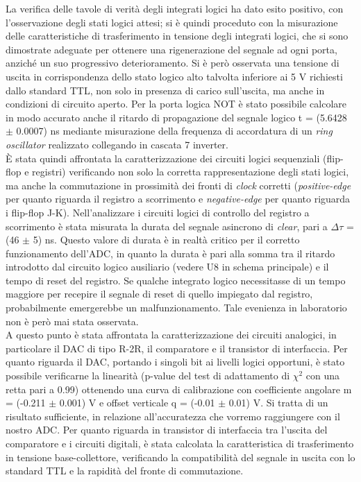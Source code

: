 \documentclass[journal]{IEEEtran}
\begin{document}
La verifica delle tavole di verità degli integrati logici ha dato esito positivo, con l'osservazione degli stati logici attesi; si è quindi proceduto con la misurazione delle caratteristiche di trasferimento in tensione degli integrati logici, che si sono dimostrate adeguate per ottenere una rigenerazione del segnale ad ogni porta, anziché un suo progressivo deterioramento. Si è però osservata una tensione di uscita in corrispondenza dello stato logico alto talvolta inferiore ai 5 V richiesti dallo standard TTL, non solo in presenza di carico sull'uscita, ma anche in condizioni di circuito aperto. Per la porta logica NOT è stato possibile calcolare in modo accurato anche il ritardo di propagazione del segnale logico t = (5.6428 $\pm$ 0.0007) ns mediante misurazione della frequenza di accordatura di un \textit{ring oscillator} realizzato collegando in cascata 7 inverter.
\\

È stata quindi affrontata la caratterizzazione dei circuiti logici sequenziali (flip-flop e registri) verificando non solo la corretta rappresentazione degli stati logici, ma anche la commutazione in prossimità dei fronti di \textit{clock} corretti (\textit{positive-edge} per quanto riguarda il registro a scorrimento e \textit{negative-edge} per quanto riguarda i flip-flop J-K). Nell'analizzare i circuiti logici di controllo del registro a scorrimento è stata misurata la durata del segnale asincrono di \textit{clear}, pari a $\Delta\tau$ = (46 $\pm$ 5) ns. Questo valore di durata è in realtà critico per il corretto funzionamento dell'ADC, in quanto la durata è pari alla somma tra il ritardo introdotto dal circuito logico ausiliario (vedere U8 in schema principale) e il tempo di reset del registro. Se qualche integrato logico necessitasse di un tempo maggiore per recepire il segnale di reset di quello impiegato dal registro, probabilmente emergerebbe un malfunzionamento. Tale evenienza in laboratorio non è però mai stata osservata.
\\

A questo punto è stata affrontata la caratterizzazione dei circuiti analogici, in particolare il DAC di tipo R-2R, il comparatore e il transistor di interfaccia. Per quanto riguarda il DAC, portando i singoli bit ai livelli logici opportuni, è stato possibile verificarne la linearità (p-value del test di adattamento di $\chi^2$ con una retta pari a 0.99) ottenendo una curva di calibrazione con coefficiente angolare m = (-0.211 $\pm$ 0.001) V e offset verticale q = (-0.01 $\pm$ 0.01) V. Si tratta di un risultato sufficiente, in relazione all'accuratezza che vorremo raggiungere con il nostro ADC. Per quanto riguarda in transistor di interfaccia tra l'uscita del comparatore e i circuiti digitali, è stata calcolata la caratteristica di trasferimento in tensione base-collettore, verificando la compatibilità del segnale in uscita con lo standard TTL e la rapidità del fronte di commutazione. 
\\
\end{document}
